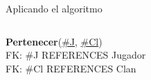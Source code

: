 \begin{frame}{Aplicando el algoritmo}
\begin{columns}[T]
\begin{column}{0.50\linewidth}
\begin{scriptsize}
{                    \textbf{Pertenecer}(\underline{\#J}, \underline{\#Cl})\\[1mm]
                    \hspace{4mm} FK: \#J REFERENCES Jugador\\[1mm]
                    \hspace{4mm} FK: \#Cl REFERENCES Clan
                }

        
            \end{scriptsize}
        \end{column}
        
    \end{columns}
   
    \vspace{10mm}

    

\end{frame}


